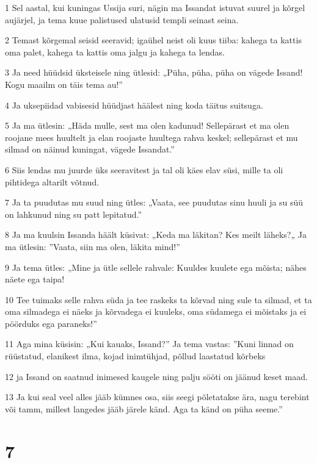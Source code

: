 \par 1 Sel aastal, kui kuningas Ussija suri, nägin ma Issandat istuvat suurel ja kõrgel aujärjel, ja tema kuue palistused ulatusid templi seinast seina.
\par 2 Temast kõrgemal seisid seeravid; igaühel neist oli kuus tiiba: kahega ta kattis oma palet, kahega ta kattis oma jalgu ja kahega ta lendas.
\par 3 Ja need hüüdsid üksteisele ning ütlesid: „Püha, püha, püha on vägede Issand! Kogu maailm on täis tema au!”
\par 4 Ja uksepiidad vabisesid hüüdjast häälest ning koda täitus suitsuga.
\par 5 Ja ma ütlesin: „Häda mulle, sest ma olen kadunud! Sellepärast et ma olen roojane mees huultelt ja elan roojaste huultega rahva keskel; sellepärast et mu silmad on näinud kuningat, vägede Issandat.”
\par 6 Siis lendas mu juurde üks seeravitest ja tal oli käes elav süsi, mille ta oli pihtidega altarilt võtnud.
\par 7 Ja ta puudutas mu suud ning ütles: „Vaata, see puudutas sinu huuli ja su süü on lahkunud ning su patt lepitatud.”
\par 8 Ja ma kuulsin Issanda häält küsivat: „Keda ma läkitan? Kes meilt läheks?„ Ja ma ütlesin: ”Vaata, siin ma olen, läkita mind!”
\par 9 Ja tema ütles: „Mine ja ütle sellele rahvale: Kuuldes kuulete ega mõista; nähes näete ega taipa!
\par 10 Tee tuimaks selle rahva süda ja tee raskeks ta kõrvad ning sule ta silmad, et ta oma silmadega ei näeks ja kõrvadega ei kuuleks, oma südamega ei mõistaks ja ei pöörduks ega paraneks!”
\par 11 Aga mina küsisin: „Kui kauaks, Issand?” Ja tema vastas: ”Kuni linnad on rüüstatud, elanikest ilma, kojad inimtühjad, põllud laastatud kõrbeks
\par 12 ja Issand on saatnud inimesed kaugele ning palju sööti on jäänud keset maad.
\par 13 Ja kui seal veel alles jääb kümnes osa, siis seegi põletatakse ära, nagu terebint või tamm, millest langedes jääb järele känd. Aga ta känd on püha seeme.”

\chapter{7}

